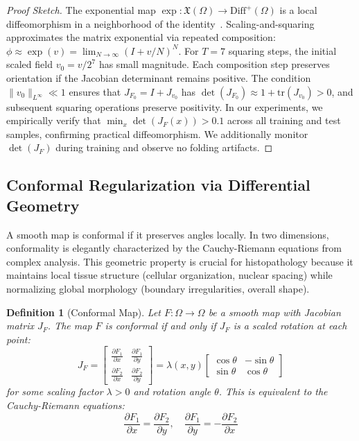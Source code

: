 \documentclass[10pt,journal,compsoc]{IEEEtran}
\newtheorem{definition}{Definition}
\begin{document}
\begin{proof}[Proof Sketch]
The exponential map $\exp: \mathfrak{X}(\Omega) \rightarrow \text{Diff}^+(\Omega)$ is a local diffeomorphism in a neighborhood of the identity~\cite{arsigny2006logdiff}. Scaling-and-squaring approximates the matrix exponential via repeated composition: $\phi \approx \exp(v) = \lim_{N \rightarrow \infty} (I + v/N)^N$. For $T=7$ squaring steps, the initial scaled field $v_0 = v/2^7$ has small magnitude. Each composition step preserves orientation if the Jacobian determinant remains positive. The condition $\|v_0\|_{L^\infty} \ll 1$ ensures that $J_{F_0} = I + J_{v_0}$ has $\det(J_{F_0}) \approx 1 + \text{tr}(J_{v_0}) > 0$, and subsequent squaring operations preserve positivity. In our experiments, we empirically verify that $\min_x \det(J_F(x)) > 0.1$ across all training and test samples, confirming practical diffeomorphism. We additionally monitor $\det(J_F)$ during training and observe no folding artifacts.
\end{proof}

\subsection{Conformal Regularization via Differential Geometry}

A smooth map is conformal if it preserves angles locally. In two dimensions, conformality is elegantly characterized by the Cauchy-Riemann equations from complex analysis. This geometric property is crucial for histopathology because it maintains local tissue structure (cellular organization, nuclear spacing) while normalizing global morphology (boundary irregularities, overall shape).

\begin{definition}[Conformal Map]
\label{def:conformal}
Let $F: \Omega \rightarrow \Omega$ be a smooth map with Jacobian matrix $J_F$. The map $F$ is conformal if and only if $J_F$ is a scaled rotation at each point:
\begin{equation}
J_F = \begin{bmatrix} \frac{\partial F_1}{\partial x} & \frac{\partial F_1}{\partial y} \\ \frac{\partial F_2}{\partial x} & \frac{\partial F_2}{\partial y} \end{bmatrix} = \lambda(x,y) \begin{bmatrix} \cos\theta & -\sin\theta \\ \sin\theta & \cos\theta \end{bmatrix}
\end{equation}
for some scaling factor $\lambda > 0$ and rotation angle $\theta$. This is equivalent to the Cauchy-Riemann equations:
\begin{equation}
\frac{\partial F_1}{\partial x} = \frac{\partial F_2}{\partial y}, \quad \frac{\partial F_1}{\partial y} = -\frac{\partial F_2}{\partial x}
\label{eq:cauchy_riemann}
\end{equation}
\end{definition}
\end{document}

